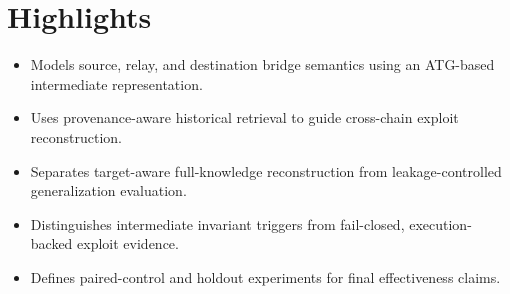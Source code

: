 \documentclass{article}
\begin{document}
\section*{Highlights}

\begin{itemize}
\item Models source, relay, and destination bridge semantics using an ATG-based intermediate representation.
\item Uses provenance-aware historical retrieval to guide cross-chain exploit reconstruction.
\item Separates target-aware full-knowledge reconstruction from leakage-controlled generalization evaluation.
\item Distinguishes intermediate invariant triggers from fail-closed, execution-backed exploit evidence.
\item Defines paired-control and holdout experiments for final effectiveness claims.
\end{itemize}
\end{document}

